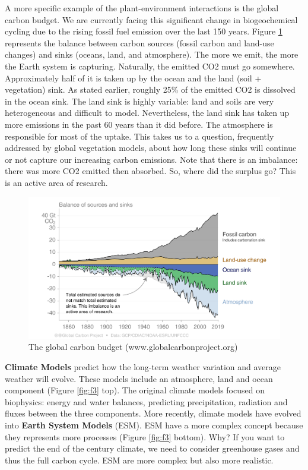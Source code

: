 \documentclass[12pt,oneside]{book}
\begin{document}
A more specific example of the plant-environment interactions is the
global carbon budget. We are currently facing this significant change in
biogeochemical cycling due to the rising fossil fuel emission over the
last 150 years. Figure \ref{fig:f2} represents the balance between
carbon sources (fossil carbon and land-use changes) and sinks (oceans,
land, and atmosphere). The more we emit, the more the Earth system is
capturing. Naturally, the emitted CO2 must go somewhere. Approximately
half of it is taken up by the ocean and the land (soil + vegetation)
sink. As stated earlier, roughly 25\% of the emitted CO2 is dissolved in
the ocean sink. The land sink is highly variable: land and soils are
very heterogeneous and difficult to model. Nevertheless, the land sink
has taken up more emissions in the past 60 years than it did before. The
atmosphere is responsible for most of the uptake. This takes us to a
question, frequently addressed by global vegetation models, about how
long these sinks will continue or not capture our increasing carbon
emissions. Note that there is an imbalance: there was more CO2 emitted
then absorbed. So, where did the surplus go? This is an active area of
research.

\begin{figure}

{\centering \includegraphics[width=0.8\linewidth]{figures/chap1/carbon_budget} 

}

\caption{The global carbon budget (www.globalcarbonproject.org)}\label{fig:f2}
\end{figure}

\textbf{Climate Models} predict how the long-term weather variation and
average weather will evolve. These models include an atmosphere, land
and ocean component (Figure \ref{fig:f3} top). The original climate
models focused on biophysics: energy and water balances, predicting
precipitation, radiation and fluxes between the three components. More
recently, climate models have evolved into \textbf{Earth System Models}
(ESM). ESM have a more complex concept because they represents more
processes (Figure \ref{fig:f3} bottom). Why? If you want to predict the
end of the century climate, we need to consider greenhouse gases and
thus the full carbon cycle. ESM are more complex but also more
realistic.
\end{document}
